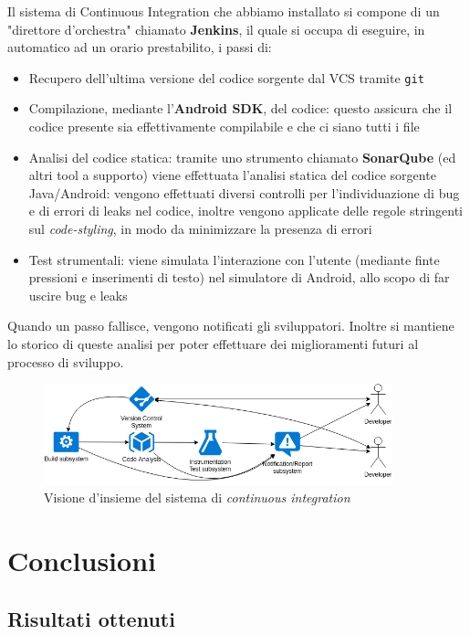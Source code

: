 \documentclass[a4paper,10pt]{memoir}
\begin{document}
Il sistema di Continuous Integration che abbiamo installato si compone di un "direttore d'orchestra" chiamato \textbf{Jenkins}, il quale si occupa di eseguire, in automatico ad un orario prestabilito, i passi di:
\begin{itemize}
\item Recupero dell'ultima versione del codice sorgente dal VCS tramite \texttt{git}
\item Compilazione, mediante l'\textbf{Android SDK}, del codice: questo assicura che il codice presente sia effettivamente compilabile e che ci siano tutti i file
\item Analisi del codice statica: tramite uno strumento chiamato \textbf{SonarQube} (ed altri tool a supporto) viene effettuata l'analisi statica del codice sorgente Java/Android: vengono effettuati diversi controlli per l'individuazione di bug e di errori di leaks nel codice, inoltre vengono applicate delle regole stringenti sul \textit{code-styling}, in modo da minimizzare la presenza di errori
\item Test strumentali: viene simulata l'interazione con l'utente (mediante finte pressioni e inserimenti di testo) nel simulatore di Android, allo scopo di far uscire bug e leaks
\end{itemize}

Quando un passo fallisce, vengono notificati gli sviluppatori. Inoltre si mantiene lo storico di queste analisi per poter effettuare dei miglioramenti futuri al processo di sviluppo.

\begin{figure}[ht]
\centering
\includegraphics[width=0.9\textwidth]{dev/ci}
\caption{Visione d'insieme del sistema di \textit{continuous integration}}
\end{figure}

\chapter{Conclusioni}

\section{Risultati ottenuti}
\end{document}
